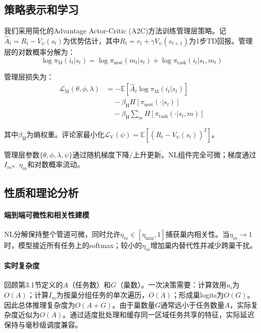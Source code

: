\documentclass[12pt,a4paper]{article}
\begin{document}
\subsection{策略表示和学习}

我们采用简化的Advantage Actor-Critic (A2C)方法训练管理层策略。记$\hat{A}_t = R_t - V_\psi(s_t)$为优势估计，其中$R_t = r_t + \gamma V_\psi(s_{t+1})$为1步TD回报。管理层的对数概率分解为：
\[\log \pi_{\mathrm{M}}(i_t | s_t) = \log \pi_{\mathrm{nest}}(m_t | s_t) + \log \pi_{\mathrm{task}}(i_t | s_t, m_t)\]

管理层损失为：
\begin{align*}
\mathcal{L}_{\mathrm{M}}(\theta, \phi, \lambda) &= -\mathbb{E}[\hat{A}_t \log \pi_{\mathrm{M}}(i_t | s_t)] \\
&\quad - \beta_{\mathrm{H}} H[\pi_{\mathrm{nest}}(\cdot | s_t)] \\
&\quad - \beta_{\mathrm{H}} \sum_m H[\pi_{\mathrm{task}}(\cdot | s_t, m)]
\end{align*}

其中$\beta_{\mathrm{H}}$为熵权重。评论家最小化$\mathcal{L}_{\mathrm{V}}(\psi) = \mathbb{E}[(R_t - V_\psi(s_t))^2]$。

管理层参数$\{\theta, \phi, \lambda, \psi\}$通过随机梯度下降/上升更新。NL组件完全可微；梯度通过$I_m$、$\eta_m$和对数概率流动。

\subsection{性质和理论分析}

\paragraph{端到端可微性和相关性建模}

NL分解保持整个管道可微，同时允许$\eta_m \in [\eta_{\min}, 1]$捕获巢内相关性。当$\eta_m \to 1$时，模型接近所有任务上的softmax；较小的$\eta_m$增加巢内替代性并减少跨巢干扰。

\paragraph{实时复杂度}

回顾第3.1节定义的$A$（任务数）和$G$（巢数）。一次决策需要：计算效用$u_i$为$O(A)$；计算$I_m$为按巢分组任务的单次遍历，$O(A)$；形成巢logits为$O(G)$。因此总体推理复杂度为$O(A+G)$。由于巢数量$G$通常远小于任务数量$A$，实际复杂度近似为$O(A)$。通过适度批处理和缓存同一区域任务共享的特征，实际延迟保持与毫秒级调度兼容。
\end{document}
